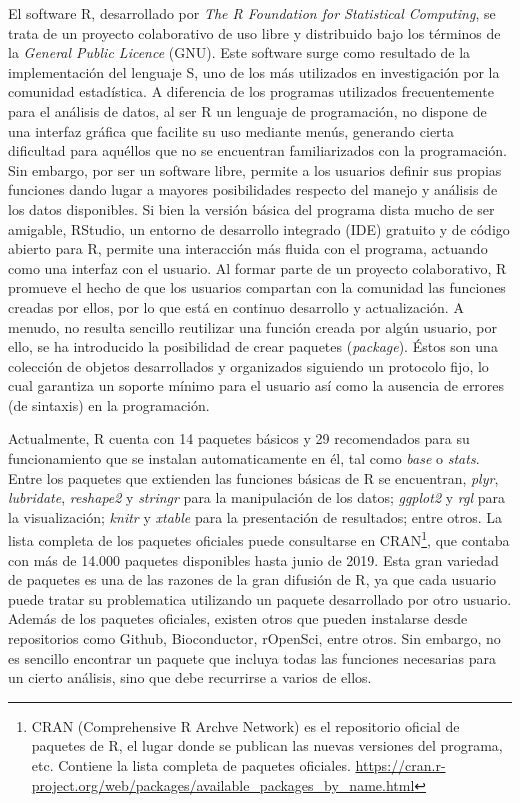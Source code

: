 El software R, desarrollado por \emph{The R Foundation for Statistical Computing}, se trata de un proyecto colaborativo de uso libre y distribuido bajo los términos de la \emph{General Public Licence} (GNU). Este software surge como resultado de la implementación del lenguaje S, uno de los más utilizados en investigación por la comunidad estadística. A diferencia de los programas utilizados frecuentemente para el análisis de datos, al ser R un lenguaje de programación, no dispone de una interfaz gráfica que facilite su uso mediante menús, generando cierta dificultad para aquéllos que no se encuentran familiarizados con la programación. Sin embargo, por ser un software libre, permite a los usuarios definir sus propias funciones dando lugar a mayores posibilidades respecto del manejo y análisis de los datos disponibles. Si bien la versión básica del programa dista mucho de ser amigable, RStudio, un entorno de desarrollo integrado (IDE) gratuito y de código abierto para R, permite una interacción más fluida con el programa, actuando como una interfaz con el usuario.  Al formar parte de un proyecto colaborativo, R promueve el hecho de que los usuarios compartan con la comunidad las funciones creadas por ellos, por lo que está en continuo desarrollo y actualización. A menudo, no resulta sencillo reutilizar una función creada por algún usuario, por ello, se ha introducido la posibilidad de crear paquetes (\emph{package}). Éstos son una colección de objetos desarrollados y organizados siguiendo un protocolo fijo, lo cual garantiza un soporte mínimo para el usuario así como la ausencia de errores (de sintaxis) en la programación.

Actualmente, R cuenta con 14 paquetes básicos y 29 recomendados para su funcionamiento que se instalan automaticamente en él, tal como \emph{base} o \emph{stats}. Entre los paquetes que extienden las funciones básicas de R se encuentran, \emph{plyr}, \emph{lubridate}, \emph{reshape2} y \emph{stringr} para la manipulación de los datos; \emph{ggplot2} y \emph{rgl} para la visualización; \emph{knitr} y \emph{xtable} para la presentación de resultados; entre otros. La lista completa de los paquetes oficiales puede consultarse en CRAN\footnote{CRAN (Comprehensive R Archve Network) es el repositorio oficial de paquetes de R, el lugar donde se publican las nuevas versiones del programa, etc. Contiene la lista completa de paquetes oficiales. \url{https://cran.r-project.org/web/packages/available_packages_by_name.html}}, que contaba con más de 14.000 paquetes disponibles hasta junio de 2019. Esta gran variedad de paquetes es una de las razones de la gran difusión de R, ya que cada usuario puede tratar su problematica utilizando un paquete desarrollado por otro usuario. Además de los paquetes oficiales, existen otros que pueden instalarse desde repositorios como Github, Bioconductor, rOpenSci, entre otros. Sin embargo, no es sencillo encontrar un paquete que incluya todas las funciones necesarias para un cierto análisis, sino que debe recurrirse a varios de ellos. 


